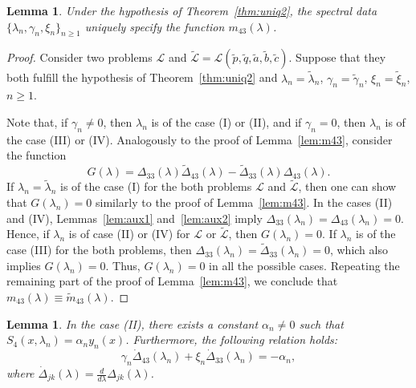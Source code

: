 \documentclass[a4paper,12pt]{article}
\newcommand{\al}{\alpha}
\newcommand{\ga}{\gamma}
\newcommand{\la}{\lambda}
\theoremstyle{plain}
\numberwithin{equation}{section}
\newtheorem{lem}[thm]{Lemma}
\theoremstyle{definition}
\theoremstyle{remark}
\begin{document}
\begin{lem} \label{lem:recm43}
Under the hypothesis of Theorem~\ref{thm:uniq2}, the spectral data $\{ \la_n, \ga_n, \xi_n \}_{n \ge 1}$ uniquely specify the function $m_{43}(\la)$.
\end{lem}

\begin{proof}
Consider two problems $\mathcal L$ and $\tilde{\mathcal L} = \mathcal L(\tilde p, \tilde q, \tilde a, \tilde b, \tilde c)$. Suppose that they both fulfill the hypothesis of Theorem~\ref{thm:uniq2} and $\la_n = \tilde \la_n$, $\ga_n = \tilde \ga_n$, $\xi_n = \tilde \xi_n$, $n \ge 1$.

Note that, if $\ga_n \ne 0$, then $\la_n$ is of the case (I) or (II), and if $\ga_n = 0$, then $\la_n$ is of the case (III) or (IV). Analogously to the proof of Lemma~\ref{lem:m43}, consider the function 
$$
G(\la) = \Delta_{33}(\la) \tilde \Delta_{43}(\la) - \tilde \Delta_{33}(\la) \Delta_{43}(\la).
$$
If $\la_n = \tilde \la_n$ is of the case (I) for the both problems $\mathcal L$ and $\tilde{\mathcal L}$, then one can show that $G(\la_n) = 0$ similarly to the proof of Lemma~\ref{lem:m43}. In the cases (II) and (IV), Lemmas~\ref{lem:aux1} and~\ref{lem:aux2} imply $\Delta_{33}(\la_n) = \Delta_{43}(\la_n) = 0$. Hence, if $\la_n$ is of case (II) or (IV) for $\mathcal L$ or $\tilde{\mathcal L}$, then $G(\la_n) = 0$. If $\la_n$ is of the case (III) for the both problems, then $\Delta_{33}(\la_n) = \tilde \Delta_{33}(\la_n) = 0$, which also implies $G(\la_n) = 0$. Thus, $G(\la_n) = 0$ in all the possible cases. Repeating the remaining part of the proof of Lemma~\ref{lem:m43}, we conclude that $m_{43}(\la) \equiv \tilde m_{43}(\la)$.
\end{proof}

\begin{lem} \label{lem:case2}
In the case (II), there exists a constant $\al_n \ne 0$ such that $S_4(x, \la_n) = \al_n y_n(x)$. Furthermore, the following relation holds:
\begin{equation} \label{findal}
\ga_n \dot \Delta_{43}(\la_n) + \xi_n \dot \Delta_{33}(\la_n) = -\al_n,
\end{equation}
where $\dot \Delta_{jk}(\la) = \frac{d}{d\la} \Delta_{jk}(\la)$.
\end{lem}
\end{document}
